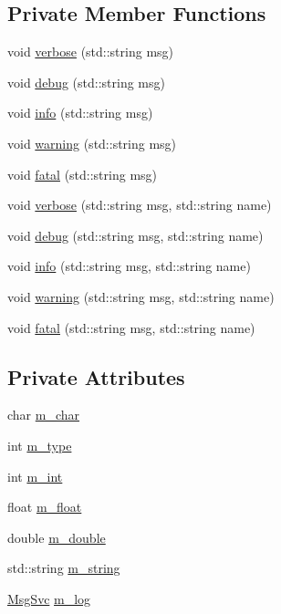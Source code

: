 \subsection*{Private Member Functions}
\begin{DoxyCompactItemize}
\item 
void \hyperlink{classvar_a3e079680ce51addea659b23d303ceedc}{verbose} (std\+::string msg)
\item 
void \hyperlink{classvar_a90d3b799c7953db985d7488de79e247d}{debug} (std\+::string msg)
\item 
void \hyperlink{classvar_a6ad63ffe8ea9495201a7b2a824547518}{info} (std\+::string msg)
\item 
void \hyperlink{classvar_a56b3d498264760e7b1212d204e6a49d4}{warning} (std\+::string msg)
\item 
void \hyperlink{classvar_a2f23892af2d80d27ebb8032f89d875f2}{fatal} (std\+::string msg)
\item 
void \hyperlink{classvar_a381db77de9128014c9ddb5cfc7793f65}{verbose} (std\+::string msg, std\+::string name)
\item 
void \hyperlink{classvar_afe9c80c1fab5c210a628bb29df513935}{debug} (std\+::string msg, std\+::string name)
\item 
void \hyperlink{classvar_a52f41c560b167041c7d4e17a42021d5c}{info} (std\+::string msg, std\+::string name)
\item 
void \hyperlink{classvar_af8e180a414b085d50d35ba585bf7717f}{warning} (std\+::string msg, std\+::string name)
\item 
void \hyperlink{classvar_af190a03a038835391edf1b1173e117ab}{fatal} (std\+::string msg, std\+::string name)
\end{DoxyCompactItemize}
\subsection*{Private Attributes}
\begin{DoxyCompactItemize}
\item 
char \hyperlink{classvar_afffb29be23233ae232502023719da1d3}{m\+\_\+char}
\item 
int \hyperlink{classvar_afd0bde61955d8a7541d3dcedc22ec2ad}{m\+\_\+type}
\item 
int \hyperlink{classvar_a2796c70baa395a5e2c5457df760249d7}{m\+\_\+int}
\item 
float \hyperlink{classvar_adb803c54ed2edb812a77241d511385e6}{m\+\_\+float}
\item 
double \hyperlink{classvar_ad8590162a1dae61824b874c615cce311}{m\+\_\+double}
\item 
std\+::string \hyperlink{classvar_a81567a7f3af11ceee9a0624648e0e904}{m\+\_\+string}
\item 
\hyperlink{classMsgSvc}{Msg\+Svc} \hyperlink{classvar_a5dfdc5180270038b686ad3013874a026}{m\+\_\+log}
\end{DoxyCompactItemize}


